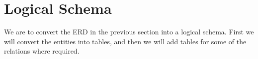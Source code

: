 \section{Logical Schema}

We are to convert the ERD in the previous section into a logical schema. First we will convert the entities into tables, and then we will add tables for some of the relations where required.